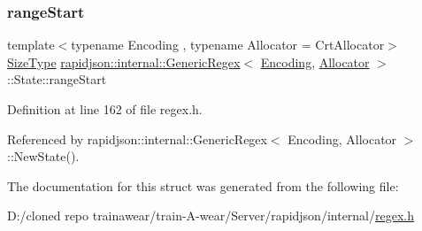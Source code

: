 \subsubsection{\texorpdfstring{rangeStart}{rangeStart}}
{\footnotesize\ttfamily template$<$typename Encoding , typename Allocator  = Crt\+Allocator$>$ \\
\mbox{\hyperlink{namespacerapidjson_a44eb33eaa523e36d466b1ced64b85c84}{Size\+Type}} \mbox{\hyperlink{classrapidjson_1_1internal_1_1_generic_regex}{rapidjson\+::internal\+::\+Generic\+Regex}}$<$ \mbox{\hyperlink{classrapidjson_1_1_encoding}{Encoding}}, \mbox{\hyperlink{classrapidjson_1_1_allocator}{Allocator}} $>$\+::State\+::range\+Start}



Definition at line 162 of file regex.\+h.



Referenced by rapidjson\+::internal\+::\+Generic\+Regex$<$ Encoding, Allocator $>$\+::\+New\+State().



The documentation for this struct was generated from the following file\+:\begin{DoxyCompactItemize}
\item 
D\+:/cloned repo trainawear/train-\/\+A-\/wear/\+Server/rapidjson/internal/\mbox{\hyperlink{regex_8h}{regex.\+h}}\end{DoxyCompactItemize}
